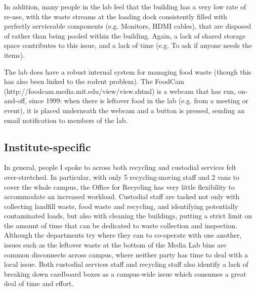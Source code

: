 \documentclass[nofonts,nols,justified,nobib]{tufte-book}
\begin{document}
In addition, many people in the lab feel that the building has a very low rate of re-use, with the waste streams at the loading dock consistently filled with perfectly serviceable components (e.g. Monitors, HDMI cables), that are disposed of rather than being pooled within the building. Again, a lack of shared storage space contributes to this issue, and a lack of time (e.g. To ask if anyone needs the items). 

The lab does have a robust internal system for managing food waste (though this has also been linked to the rodent problem). The FoodCam (http://foodcam.media.mit.edu/view/view.shtml) is a webcam that has run, on-and-off, since 1999: when there is leftover food in the lab (e.g. from a meeting or event), it is placed underneath the webcam and a button is pressed, sending an email notification to members of the lab.

\subsection*{Institute-specific}

In general, people I spoke to across both recycling and custodial services felt over-stretched. In particular, with only 5 recycling-moving staff and 2 vans to cover the whole campus, the Office for Recycling has very little flexibility to accommodate an increased workload. Custodial staff are tasked not only with collecting landfill waste, food waste and recycling, and identifying potentially contaminated loads, but also with cleaning the buildings, putting a strict limit on the amount of time that can be dedicated to waste collection and inspection. Although the departments try where they can to co-operate with one another, issues such as the leftover waste at the bottom of the Media Lab bins are common disconnects across campus, where neither party has time to deal with a local issue. Both custodial services staff and recycling staff also identify a lack of breaking down cardboard boxes as a campus-wide issue which consumes a great deal of time and effort.
\end{document}
